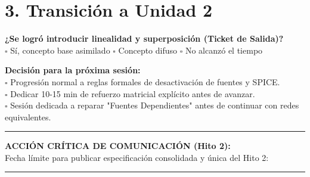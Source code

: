 \documentclass[11pt, a4paper]{article}
\begin{document}
\section*{3. Transición a Unidad 2}
\textbf{¿Se logró introducir linealidad y superposición (Ticket de Salida)?} \\
$\square$ Sí, concepto base asimilado \quad $\square$ Concepto difuso \quad $\square$ No alcanzó el tiempo

\vspace{0.2cm}
\textbf{Decisión para la próxima sesión:} \\
$\square$ Progresión normal a reglas formales de desactivación de fuentes y SPICE. \\
$\square$ Dedicar 10-15 min de refuerzo matricial explícito antes de avanzar. \\
$\square$ Sesión dedicada a reparar "Fuentes Dependientes" antes de continuar con redes equivalentes.

\vspace{0.4cm}
\hrule
\vspace{0.2cm}
\textbf{ACCIÓN CRÍTICA DE COMUNICACIÓN (Hito 2):} \\
Fecha límite para publicar especificación consolidada y única del Hito 2: \rule{4cm}{0.4pt}
\end{document}
